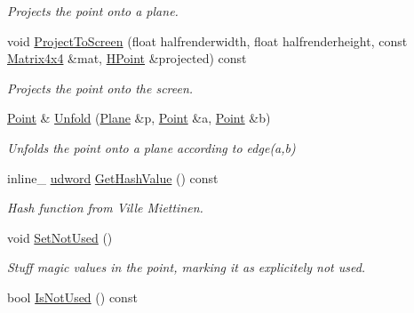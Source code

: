 \begin{DoxyCompactItemize}
\begin{DoxyCompactList}\small\item\em Projects the point onto a plane. \end{DoxyCompactList}\item 
void \hyperlink{classOpcode_1_1Point_a0069c972353d11800870127a19536b8c}{Project\+To\+Screen} (float halfrenderwidth, float halfrenderheight, const \hyperlink{classOpcode_1_1Matrix4x4}{Matrix4x4} \&mat, \hyperlink{classOpcode_1_1HPoint}{H\+Point} \&projected) const \hypertarget{classOpcode_1_1Point_a0069c972353d11800870127a19536b8c}{}\label{classOpcode_1_1Point_a0069c972353d11800870127a19536b8c}

\begin{DoxyCompactList}\small\item\em Projects the point onto the screen. \end{DoxyCompactList}\item 
\hyperlink{classOpcode_1_1Point}{Point} \& \hyperlink{classOpcode_1_1Point_a95e6a168965ec91cbe5dbf0fd7d8b0d8}{Unfold} (\hyperlink{classOpcode_1_1Plane}{Plane} \&p, \hyperlink{classOpcode_1_1Point}{Point} \&a, \hyperlink{classOpcode_1_1Point}{Point} \&b)\hypertarget{classOpcode_1_1Point_a95e6a168965ec91cbe5dbf0fd7d8b0d8}{}\label{classOpcode_1_1Point_a95e6a168965ec91cbe5dbf0fd7d8b0d8}

\begin{DoxyCompactList}\small\item\em Unfolds the point onto a plane according to edge(a,b) \end{DoxyCompactList}\item 
inline\+\_\+ \hyperlink{IceTypes_8h_a44c6f1920ba5551225fb534f9d1a1733}{udword} \hyperlink{classOpcode_1_1Point_a4309f3090a397178ae748cdaf7414187}{Get\+Hash\+Value} () const \hypertarget{classOpcode_1_1Point_a4309f3090a397178ae748cdaf7414187}{}\label{classOpcode_1_1Point_a4309f3090a397178ae748cdaf7414187}

\begin{DoxyCompactList}\small\item\em Hash function from Ville Miettinen. \end{DoxyCompactList}\item 
void \hyperlink{classOpcode_1_1Point_aec2d7dcd03f7ba6ac7899704ac1983ba}{Set\+Not\+Used} ()\hypertarget{classOpcode_1_1Point_aec2d7dcd03f7ba6ac7899704ac1983ba}{}\label{classOpcode_1_1Point_aec2d7dcd03f7ba6ac7899704ac1983ba}

\begin{DoxyCompactList}\small\item\em Stuff magic values in the point, marking it as explicitely not used. \end{DoxyCompactList}\item 
bool \hyperlink{classOpcode_1_1Point_aa0524356cffaf569928f0817b09a805d}{Is\+Not\+Used} () const \hypertarget{classOpcode_1_1Point_aa0524356cffaf569928f0817b09a805d}{}\label{classOpcode_1_1Point_aa0524356cffaf569928f0817b09a805d}


\end{DoxyCompactItemize}
